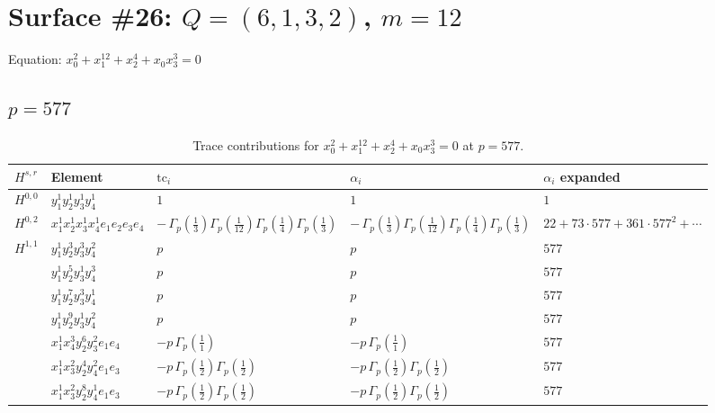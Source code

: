 \documentclass[11pt]{article}
\begin{document}
\section*{Surface \#26: $Q=(6, 1, 3, 2)$, $m=12$}

Equation: $x_0^{2} + x_1^{12} + x_2^{4} + x_0 x_3^{3} = 0$

\subsection*{$p = 577$}

\begin{table}[ht]
\centering
\caption{Trace contributions for $x_0^{2} + x_1^{12} + x_2^{4} + x_0 x_3^{3} = 0$ at $p=577$.}\label{tab:deformed-26}
\renewcommand{\arraystretch}{1.1}
{\scriptsize
\begin{tabular}{@{}lllll@{}}
\toprule
$H^{s,r}$ & Element & $\mathrm{tc}_i$ & $\alpha_i$ & $\alpha_i$ expanded \\
\midrule
$H^{0,0}$ & $y_{1}^{1} y_{2}^{1} y_{3}^{1} y_{4}^{1}$ & $1$ & $1$ & $1$ \\
\midrule
$H^{0,2}$ & $x_{1}^{1} x_{2}^{1} x_{3}^{1} x_{4}^{1}  e_{1} e_{2} e_{3} e_{4}$ & $- \, \Gamma_p \left( \frac{1}{3} \right) \Gamma_p \left( \frac{1}{12} \right) \Gamma_p \left( \frac{1}{4} \right) \Gamma_p \left( \frac{1}{3} \right)$ & $- \, \Gamma_p \left( \frac{1}{3} \right) \Gamma_p \left( \frac{1}{12} \right) \Gamma_p \left( \frac{1}{4} \right) \Gamma_p \left( \frac{1}{3} \right)$ & $22{+}73{\cdot}577{+}361{\cdot}577^{2}{+}\cdots$ \\
\midrule
$H^{1,1}$ & $y_{1}^{1} y_{2}^{3} y_{3}^{3} y_{4}^{2}$ & $p \,$ & $p \,$ & $577$ \\
 & $y_{1}^{1} y_{2}^{5} y_{3}^{1} y_{4}^{3}$ & $p \,$ & $p \,$ & $577$ \\
 & $y_{1}^{1} y_{2}^{7} y_{3}^{3} y_{4}^{1}$ & $p \,$ & $p \,$ & $577$ \\
 & $y_{1}^{1} y_{2}^{9} y_{3}^{1} y_{4}^{2}$ & $p \,$ & $p \,$ & $577$ \\
 & $x_{1}^{1} x_{4}^{3} y_{2}^{6} y_{3}^{2} e_{1} e_{4}$ & $- p \, \Gamma_p \left( \frac{1}{1} \right)$ & $- p \, \Gamma_p \left( \frac{1}{1} \right)$ & $577$ \\
 & $x_{1}^{1} x_{3}^{2} y_{2}^{4} y_{4}^{2} e_{1} e_{3}$ & $- p \, \Gamma_p \left( \frac{1}{2} \right) \Gamma_p \left( \frac{1}{2} \right)$ & $- p \, \Gamma_p \left( \frac{1}{2} \right) \Gamma_p \left( \frac{1}{2} \right)$ & $577$ \\
 & $x_{1}^{1} x_{3}^{2} y_{2}^{8} y_{4}^{1} e_{1} e_{3}$ & $- p \, \Gamma_p \left( \frac{1}{2} \right) \Gamma_p \left( \frac{1}{2} \right)$ & $- p \, \Gamma_p \left( \frac{1}{2} \right) \Gamma_p \left( \frac{1}{2} \right)$ & $577$ \\

\end{tabular}}
\end{table}
\end{document}
